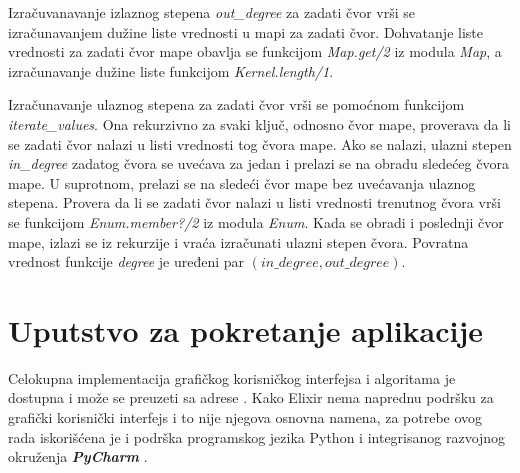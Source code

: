 \documentclass[12pt,oneside]{memoir}
\begin{document}
Izračuvanavanje izlaznog stepena \textit{out\_degree} za zadati čvor vrši se izračunavanjem dužine liste vrednosti u mapi za zadati čvor. Dohvatanje liste vrednosti za zadati čvor mape obavlja se funkcijom \textit{Map.get/2} iz modula \textit{Map}, a izračunavanje dužine liste funkcijom \textit{Kernel.length/1}.

Izračunavanje ulaznog stepena za zadati čvor vrši se pomoćnom funkcijom \textit{iterate\_values}. Ona rekurzivno za svaki ključ, odnosno čvor mape, proverava da li se zadati čvor nalazi u listi vrednosti tog čvora mape. Ako se nalazi, ulazni stepen \textit{in\_degree} zadatog čvora se uvećava za jedan i prelazi se na obradu sledećeg čvora mape. U suprotnom, prelazi se na sledeći čvor mape bez uvećavanja ulaznog stepena. Provera da li se zadati čvor nalazi u listi vrednosti trenutnog čvora vrši se funkcijom \textit{Enum.member?/2} iz modula \textit{Enum}. Kada se obradi i poslednji čvor mape, izlazi se iz rekurzije i vraća izračunati ulazni stepen čvora. Povratna vrednost funkcije \textit{degree} je uređeni par $(\textit{in\_degree}, \textit{out\_degree})$.



\section{Uputstvo za pokretanje aplikacije}

Celokupna implementacija grafičkog korisničkog interfejsa i algoritama je dostupna i može se preuzeti sa adrese \cite{GIT}.
Kako Elixir nema naprednu podršku za grafički korisnički interfejs i to nije njegova osnovna namena, za potrebe ovog rada iskorišćena je i podrška programskog jezika Python i integrisanog razvojnog okruženja \textbf{\textit{PyCharm}} \cite{PyCharm}.

\end{document}
